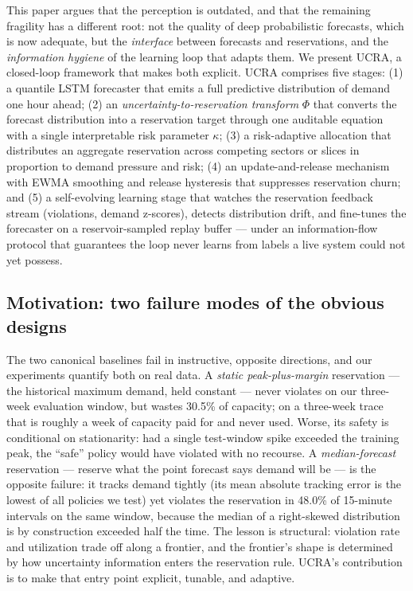 This paper argues that the perception is outdated, and that the
remaining fragility has a different root: not the quality of deep
probabilistic forecasts, which is now adequate, but the
\emph{interface} between forecasts and reservations, and the
\emph{information hygiene} of the learning loop that adapts them. We
present UCRA, a closed-loop framework that makes both explicit. UCRA
comprises five stages: (1) a quantile LSTM forecaster that emits a
full predictive distribution of demand one hour ahead; (2) an
\emph{uncertainty-to-reservation transform} $\Phi$ that converts the
forecast distribution into a reservation target through one auditable
equation with a single interpretable risk parameter $\kappa$; (3) a
risk-adaptive allocation that distributes an aggregate reservation
across competing sectors or slices in proportion to demand pressure
and risk; (4) an update-and-release mechanism with EWMA smoothing and
release hysteresis that suppresses reservation churn; and (5) a
self-evolving learning stage that watches the reservation feedback
stream (violations, demand z-scores), detects distribution drift, and
fine-tunes the forecaster on a reservoir-sampled replay buffer ---
under an information-flow protocol that guarantees the loop never
learns from labels a live system could not yet possess.

\subsection{Motivation: two failure modes of the obvious designs}

The two canonical baselines fail in instructive, opposite directions,
and our experiments quantify both on real data. A \emph{static
peak-plus-margin} reservation --- the historical maximum demand, held
constant --- never violates on our three-week evaluation window, but
wastes 30.5\% of capacity; on a three-week trace that is roughly a
week of capacity paid for and never used. Worse, its safety is
conditional on stationarity: had a single test-window spike exceeded
the training peak, the ``safe'' policy would have violated with no
recourse. A \emph{median-forecast} reservation --- reserve what the
point forecast says demand will be --- is the opposite failure: it
tracks demand tightly (its mean absolute tracking error is the lowest
of all policies we test) yet violates the reservation in 48.0\% of
15-minute intervals on the same window, because the median of a
right-skewed distribution is by construction exceeded half the time.
The lesson is structural: violation rate and utilization trade off
along a frontier, and the frontier's shape is determined by how
uncertainty information enters the reservation rule. UCRA's
contribution is to make that entry point explicit, tunable, and
adaptive.

